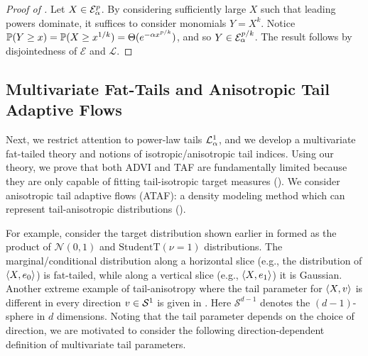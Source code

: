 \documentclass[../../thesis.tex]{subfiles}
\begin{document}

\begin{proof}[Proof of ]
  Let $X \in \mathcal{E}^p_\alpha$.
  By considering sufficiently large $X$ such that leading powers dominate, it suffices to consider monomials $Y = X^k$.
  Notice $\mathbb{P}(Y \geq x) = \mathbb{P}(X \geq x^{1/k}) = \Theta(e^{-\alpha x^{p/k}})$, and so
  $Y \in \mathcal{E}^{p/k}_\alpha$. The result follows by disjointedness of $\mathcal{E}$ and $\mathcal{L}$.
\end{proof}



\subsection{Multivariate Fat-Tails and Anisotropic Tail Adaptive Flows}

Next, we restrict attention to power-law tails $\mathcal{L}^1_\alpha$, and we develop a multivariate fat-tailed theory and notions of isotropic/anisotropic tail indices. Using our theory, we prove that both ADVI and TAF are fundamentally limited because they
are only capable of fitting tail-isotropic target measures ().
We consider anisotropic tail adaptive flows (ATAF): a density
modeling method which can represent tail-anisotropic distributions ().


For example, consider the target distribution shown earlier in  formed as the product of $\mathcal{N}(0,1)$ and $\text{StudentT}(\nu=1)$ distributions.
The marginal/conditional distribution along a horizontal slice (e.g., the distribution of $\braket{X,e_0}$)
is fat-tailed, while along a vertical slice (e.g., $\braket{X,e_1}$) it is Gaussian.
Another extreme example of tail-anisotropy where the tail parameter for
$\braket{X,v}$ is different in every direction $v \in {\mathcal{S}}^{1}$
is given in . Here $\mathcal{S}^{d-1}$ denotes the $(d-1)$-sphere in $d$ dimensions.
Noting that the tail parameter depends on the choice of direction, we are motivated to consider
the following direction-dependent definition of multivariate tail parameters.
\end{document}

